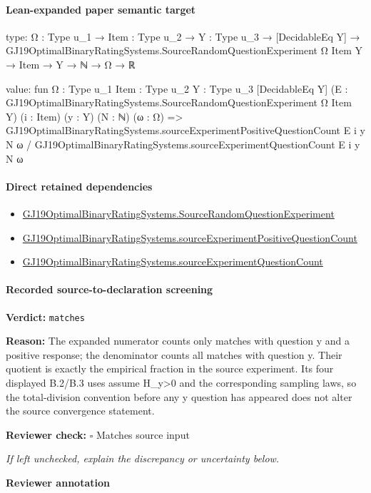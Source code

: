 \documentclass[10pt]{article}
\newcommand{\reviewerbox}{%
  \par\noindent\fbox{\parbox{0.96\linewidth}{\rule{0pt}{0.38in}}}\par
}
\newcommand{\reviewmatch}[1]{%
  \par\noindent\textbf{Reviewer check:} $\square$\; #1\par
  \noindent\emph{If left unchecked, explain the discrepancy or uncertainty below.}\par
}
\begin{document}
\paragraph{Lean-expanded paper semantic target}
\begin{ReviewVerbatim}
type:
{Ω : Type u_1} →
  {Item : Type u_2} →
    {Y : Type u_3} →
      [DecidableEq Y] → GJ19OptimalBinaryRatingSystems.SourceRandomQuestionExperiment Ω Item Y → Item → Y → ℕ → Ω → ℝ

value:
fun {Ω : Type u_1} {Item : Type u_2} {Y : Type u_3} [DecidableEq Y]
    (E : GJ19OptimalBinaryRatingSystems.SourceRandomQuestionExperiment Ω Item Y) (i : Item) (y : Y) (N : ℕ) (ω : Ω) =>
  GJ19OptimalBinaryRatingSystems.sourceExperimentPositiveQuestionCount E i y N ω /
    GJ19OptimalBinaryRatingSystems.sourceExperimentQuestionCount E i y N ω
\end{ReviewVerbatim}

\paragraph{Direct retained dependencies}
\begin{itemize}\raggedright
\item \hyperlink{paper-prerequisite-7a235f61a510cc28}{GJ19\allowbreak{}Optimal\allowbreak{}Binary\allowbreak{}Rating\allowbreak{}Systems.\allowbreak{}Source\allowbreak{}Random\allowbreak{}Question\allowbreak{}Experiment}
\item \hyperlink{governing-declaration-4da29737a77b01da}{GJ19\allowbreak{}Optimal\allowbreak{}Binary\allowbreak{}Rating\allowbreak{}Systems.\allowbreak{}source\allowbreak{}Experiment\allowbreak{}Positive\allowbreak{}Question\allowbreak{}Count}
\item \hyperlink{governing-declaration-893d3f56b883ef9c}{GJ19\allowbreak{}Optimal\allowbreak{}Binary\allowbreak{}Rating\allowbreak{}Systems.\allowbreak{}source\allowbreak{}Experiment\allowbreak{}Question\allowbreak{}Count}
\end{itemize}
\paragraph{Recorded source-to-declaration screening}
\textbf{Verdict:} \texttt{matches}
\\
{\raggedright
\textbf{Reason:} The expanded numerator counts only matches with question y and a positive response;\allowbreak{} the denominator counts all matches with question y.\allowbreak{} Their quotient is exactly the empirical fraction in the source experiment.\allowbreak{} Its four displayed B.\allowbreak{}2/\allowbreak{}B.\allowbreak{}3 uses assume H\_\allowbreak{}y>0 and the corresponding sampling laws, so the total-\allowbreak{}division convention before any y question has appeared does not alter the source convergence statement.\allowbreak{}
\par}
\reviewmatch{Matches source input}
\noindent\textbf{Reviewer annotation}\par
\reviewerbox
\clearpage
\hypertarget{paper-prerequisite-034cc6789e824c8b}{}
\end{document}
